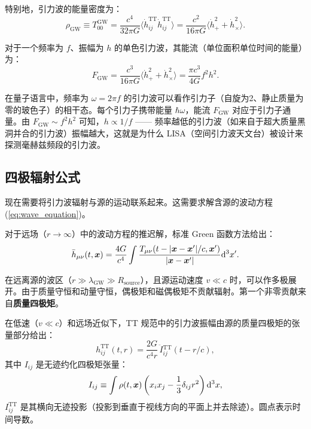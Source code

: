 特别地，引力波的能量密度为：
\begin{equation}
    \rho_{\text{GW}} \equiv T_{00}^{\text{GW}} = \frac{c^4}{32\pi G} \langle \dot{h}_{ij}^{\text{TT}} \dot{h}_{ij}^{\text{TT}} \rangle
    = \frac{c^2}{16\pi G} \langle \dot{h}_+^2 + \dot{h}_\times^2 \rangle.
    \label{eq:GW_energy_density}
\end{equation}

对于一个频率为 $f$、振幅为 $h$ 的单色引力波，其能流（单位面积单位时间的能量）为：
\begin{equation}
    F_{\text{GW}} = \frac{c^3}{16\pi G} \langle \dot{h}_+^2 + \dot{h}_\times^2 \rangle
    = \frac{\pi c^3}{4G} f^2 h^2.
    \label{eq:GW_flux}
\end{equation}

\begin{note}
在量子语言中，频率为 $\omega = 2\pi f$ 的引力波可以看作引力子（自旋为2、静止质量为零的玻色子）的相干态。每个引力子携带能量 $\hbar\omega$，能流 $F_{\text{GW}}$ 对应于引力子通量。由 $F_{\text{GW}} \sim f^2 h^2$ 可知，$h \propto 1/f$ —— 频率越低的引力波（如来自于超大质量黑洞并合的引力波）振幅越大，这就是为什么 LISA（空间引力波天文台）被设计来探测毫赫兹频段的引力波。
\end{note}

\subsection{四极辐射公式}

现在需要将引力波辐射与源的运动联系起来。这需要求解含源的波动方程 (\ref{eq:wave_equation})。

对于远场（$r \to \infty$）中的波动方程的推迟解，标准 Green 函数方法给出：
\begin{equation}
    \bar{h}_{\mu\nu}(t, \vb*{x}) = \frac{4G}{c^4} \int \frac{T_{\mu\nu}(t - |\vb*{x} - \vb*{x}'|/c, \vb*{x}')}{|\vb*{x} - \vb*{x}'|} \dd^3 x'.
    \label{eq:retarded_solution}
\end{equation}

在远离源的波区（$r \gg \lambda_{\text{GW}} \gg R_{\text{source}}$），且源运动速度 $v \ll c$ 时，可以作多极展开。由于质量守恒和动量守恒，偶极矩和磁偶极矩不贡献辐射。第一个非零贡献来自\textbf{质量四极矩}。

\begin{theorem}
在低速（$v \ll c$）和远场近似下，TT 规范中的引力波振幅由源的质量四极矩的张量部分给出：
\begin{equation}
    \boxed{h_{ij}^{\text{TT}}(t, r) = \frac{2G}{c^4 r} \, \ddot{I}\!\!_{ij}^{\text{TT}}(t - r/c)},
    \label{eq:quadrupole_amplitude}
\end{equation}
其中 $I_{ij}$ 是无迹约化四极矩张量：
\begin{equation}
    I_{ij} \equiv \int \rho(t, \vb*{x}) \left(x_i x_j - \frac{1}{3}\delta_{ij}r^2\right) \dd^3 x,
\end{equation}
$I_{ij}^{\text{TT}}$ 是其横向无迹投影（投影到垂直于视线方向的平面上并去除迹）。圆点表示时间导数。
\end{theorem}

